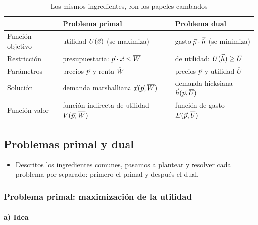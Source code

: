 \documentclass[11pt]{article}
\begin{document}
\begin{table}[H]
\centering\small
\caption{Los mismos ingredientes, con los papeles cambiados}\label{tab:ingredientes}
\renewcommand{\arraystretch}{1.3}
\begin{tabular}{|>{\raggedright\arraybackslash}p{}|>{\raggedright\arraybackslash}p{}|>{\raggedright\arraybackslash}p{}|}
\hline
\rowcolor{tceeazulpalido} & \textbf{Problema primal} & \textbf{Problema dual}\\
\hline
Función objetivo & utilidad $U(\vec{x})$ (se maximiza) & gasto $\vec{p}\cdot\vec{h}$ (se minimiza)\\
\hline
Restricción & presupuestaria: $\vec{p}\cdot\vec{x}\leq\overline{W}$ & de utilidad: $U(\vec{h})\geq\overline{U}$\\
\hline
Parámetros & precios $\vec{p}$ y renta $\overline{W}$ & precios $\vec{p}$ y utilidad $\overline{U}$\\
\hline
Solución & demanda marshalliana $\vec{x}(\vec{p},\overline{W})$ & demanda hicksiana $\vec{h}(\vec{p},\overline{U})$\\
\hline
Función valor & función indirecta de utilidad $V(\vec{p},\overline{W})$ & función de gasto $E(\vec{p},\overline{U})$\\
\hline
\end{tabular}
\end{table}

\subsection{Problemas primal y dual}\label{sec:problemas-primal-dual}

\begin{itemize}
\item Descritos los ingredientes comunes, pasamos a plantear y resolver cada problema por separado: primero el primal y después el dual.
\end{itemize}

\subsubsection{Problema primal: maximización de la utilidad}\label{sec:problema-primal-maximizacion}

\paragraph{a) Idea}
\end{document}
